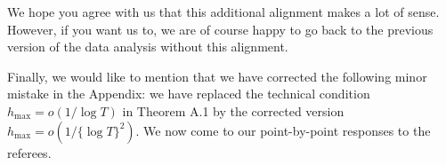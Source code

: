 \documentclass[a4paper,12pt]{article}
\begin{document}
\begin{enumerate}[label=(\roman*), leftmargin=0.8cm]

We hope you agree with us that this additional alignment makes a lot of sense. However, if you want us to, we are of course happy to go back to the previous version of the data analysis without this alignment. 

\end{enumerate}
Finally, we would like to mention that we have corrected the following minor mistake in the Appendix: we have replaced the technical condition $h_{\max} = o(1/\log T)$ in Theorem A.1 by the corrected version $h_{\max} = o(1/\{\log T\}^2)$. We now come to our point-by-point responses to the referees. 



\end{document}
